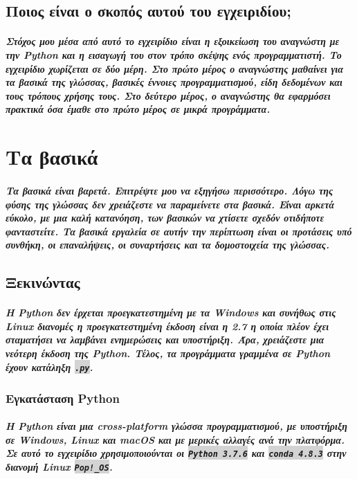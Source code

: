 \documentclass[a4paper,10pt]{report}
\begin{document}
\section{Ποιος είναι ο σκοπός αυτού του εγχειριδίου;}
\paragraph{
    Στόχος μου μέσα από αυτό το εγχειρίδιο είναι η εξοικείωση του αναγνώστη
    με την Python και η εισαγωγή του στον τρόπο σκέψης ενός προγραμματιστή.
    Το εγχειρίδιο χωρίζεται σε δύο μέρη. Στο πρώτο μέρος ο αναγνώστης μαθαίνει
    για τα βασικά της γλώσσας, βασικές έννοιες προγραμματισμού, είδη δεδομένων
    και τους τρόπους χρήσης τους. Στο δεύτερο μέρος, ο αναγνώστης θα εφαρμόσει
    πρακτικά όσα έμαθε στο πρώτο μέρος σε μικρά προγράμματα.
}

\chapter{Τα βασικά}
\paragraph{
    Τα βασικά είναι βαρετά. Επιτρέψτε μου να εξηγήσω περισσότερο. Λόγω της
    φύσης της γλώσσας δεν χρειάζεστε να παραμείνετε στα βασικά. Είναι αρκετά
    εύκολο, με μια καλή κατανόηση, των βασικών να χτίσετε σχεδόν οτιδήποτε
    φανταστείτε. Τα βασικά εργαλεία σε αυτήν την περίπτωση είναι οι προτάσεις
    υπό συνθήκη, οι επαναλήψεις, οι συναρτήσεις και τα δομοστοιχεία της γλώσσας.
}
\section{Ξεκινώντας}
\paragraph{
    Η Python δεν έρχεται προεγκατεστημένη με τα Windows και συνήθως στις
    Linux διανομές η προεγκατεστημένη έκδοση είναι η 2.7 η οποία πλέον έχει
    σταματήσει να λαμβάνει ενημερώσεις και υποστήριξη. Άρα, χρειάζεστε μια
    νεότερη έκδοση της Python. Τέλος, τα προγράμματα γραμμένα σε Python
    έχουν κατάληξη \colorbox{lightgray}{\lstinline{.py}}.
}
\subsection{Εγκατάσταση Python}
\paragraph{
    Η Python είναι μια cross-platform γλώσσα προγραμματισμού, με υποστήριξη
    σε Windows, Linux και macOS και με μερικές αλλαγές ανά την πλατφόρμα.
    Σε αυτό το εγχειρίδιο χρησιμοποιούνται οι
    \colorbox{lightgray}{\lstinline{Python 3.7.6}} και
    \colorbox{lightgray}{\lstinline{conda 4.8.3}}
    στην διανομή Linux \colorbox{lightgray}{\lstinline{Pop!_OS}}.
}
\end{document}
